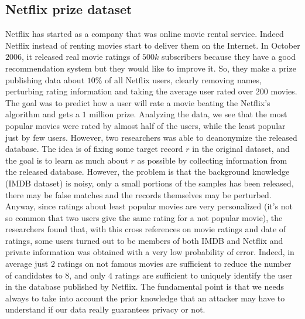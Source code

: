 \subsection{Netflix prize dataset}
Netflix has started as a company that was online movie rental service. Indeed Netflix instead of renting movies start to deliver them on the Internet. In October $2006$, it released real movie ratings of $500k$ subscribers because they have a good recommendation system but they would like to improve it. So, they make a prize publishing data about $10 \%$ of all Netflix users, clearly removing names, perturbing rating information and taking the average user rated over $200$ movies. The goal was to predict how a user will rate a movie beating the Netflix's algorithm and gets a $1$ million prize. Analyzing the data, we see that the most popular movies were rated by almost half of the users, while the least popular just by few users. However, two researchers was able to deanonymize the released database. The idea is of fixing some target record $r$ in the original dataset, and the goal is to learn as much about $r$ as possible by collecting information from the released database. However, the problem is that the background knowledge (IMDB dataset) is noisy, only a small portions of the samples has been released, there may be false matches and the records themselves may be perturbed. Anyway, since ratings about least popular movies are very personalized (it's not so common that two users give the same rating for a not popular movie), the researchers found that, with this cross references on movie ratings and date of ratings, some users turned out to be members of both IMDB and Netflix and private information was obtained with a very low probability of error. Indeed, in average just $2$ ratings on not famous movies are sufficient to reduce the number of candidates to $8$, and only $4$ ratings are sufficient to uniquely identify the user in the database published by Netflix. The fundamental point is that we needs always to take into account the prior knowledge that an attacker may have to understand if our data really guarantees privacy or not.

